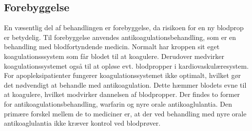 \subsection{Forebyggelse}
En væsentlig del af behandlingen er forebyggelse, da risikoen for en ny blodprop er betydelig. Til forebyggelse anvendes antikoagulationsbehandling, som er en behandling med blodfortyndende medicin. Normalt har kroppen sit eget koagulationsssystem som får blodet til at koagulere. Derudover medvirker koagulationssystemet også til at opløse evt. blodpropper i kardiovaskulæresystem. For apopleksipatienter fungerer koagulationssystemet ikke optimalt, hvilket gør det nødvendigt at behandle med antikoagulation. Dette hæmmer blodets evne til at koagulere, hvilket modvirker dannelsen af blodpropper. Der findes to former for antikoagulationsbehandling, warfarin og nyre orale antikoaglulantia. Den primære forskel mellem de to mediciner er, at der ved behandling med nyre orale antikoaglulantia ikke kræver kontrol ved blodprøver.\cite{Kjaergaard2015}

